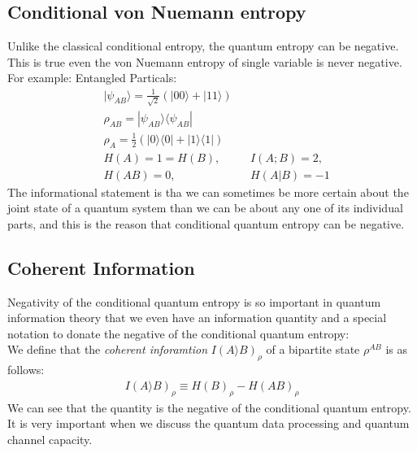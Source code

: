 \subsection{Conditional von Nuemann entropy}
Unlike the classical conditional entropy, the quantum entropy can be negative. This is true even the von Nuemann entropy of single variable is never negative. \\
For example:
Entangled Particals:
\begin{align*}
& |\psi_{AB} \rangle = \frac{1}{\sqrt{2}}(|00\rangle + |11\rangle) \\
& \rho_{AB}= |\psi_{AB} \rangle \langle \psi_{AB}| \\
& \rho_A=\frac{1}{2}(|0\rangle \langle 0| + |1\rangle \langle 1|) \\
& H(A)=1=H(B), & &I(A;B)=2,  \\
& H(AB)=0, & &H(A|B)=-1 
\end{align*}
The informational statement is tha we can sometimes be more certain about the joint state of a quantum system than we can be about any one of its individual parts, and this is the reason that conditional  quantum entropy can be negative.

\subsection{Coherent Information}
Negativity of the conditional quantum entropy is so important in quantum information theory that we even have an information quantity and a special notation to donate the negative of the conditional quantum entropy:\\
We define that the \textit{coherent inforamtion} $I(A\rangle B)_{\rho}$ of a bipartite state $\rho^{AB}$ is as follows:
\begin{align*}
I(A\rangle B)_{\rho} \equiv H(B)_{\rho}-H(AB)_{\rho}
\end{align*}
We can see that the quantity is the negative of the conditional quantum entropy. It is very important when we discuss the quantum data processing and quantum channel capacity.